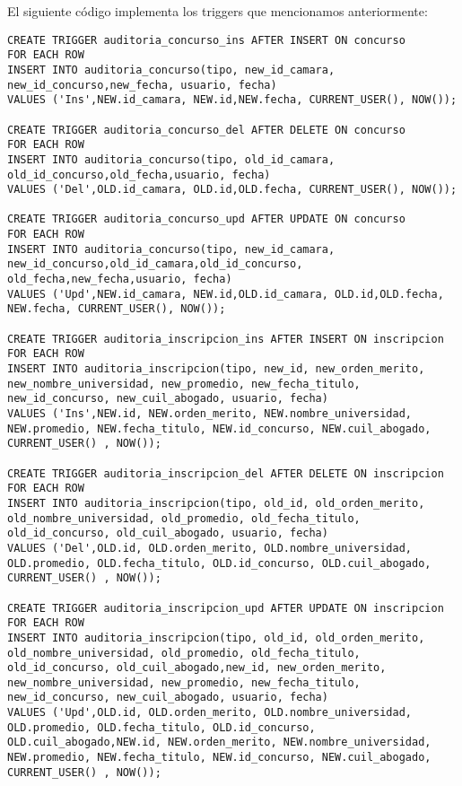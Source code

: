 El siguiente código implementa los triggers que mencionamos anteriormente:

\begin{verbatim}
CREATE TRIGGER auditoria_concurso_ins AFTER INSERT ON concurso
FOR EACH ROW
INSERT INTO auditoria_concurso(tipo, new_id_camara, new_id_concurso,new_fecha, usuario, fecha)
VALUES ('Ins',NEW.id_camara, NEW.id,NEW.fecha, CURRENT_USER(), NOW());

CREATE TRIGGER auditoria_concurso_del AFTER DELETE ON concurso
FOR EACH ROW
INSERT INTO auditoria_concurso(tipo, old_id_camara, old_id_concurso,old_fecha,usuario, fecha)
VALUES ('Del',OLD.id_camara, OLD.id,OLD.fecha, CURRENT_USER(), NOW());

CREATE TRIGGER auditoria_concurso_upd AFTER UPDATE ON concurso
FOR EACH ROW
INSERT INTO auditoria_concurso(tipo, new_id_camara, new_id_concurso,old_id_camara,old_id_concurso, old_fecha,new_fecha,usuario, fecha)
VALUES ('Upd',NEW.id_camara, NEW.id,OLD.id_camara, OLD.id,OLD.fecha, NEW.fecha, CURRENT_USER(), NOW());

CREATE TRIGGER auditoria_inscripcion_ins AFTER INSERT ON inscripcion
FOR EACH ROW
INSERT INTO auditoria_inscripcion(tipo, new_id, new_orden_merito, new_nombre_universidad, new_promedio, new_fecha_titulo, new_id_concurso, new_cuil_abogado, usuario, fecha)
VALUES ('Ins',NEW.id, NEW.orden_merito, NEW.nombre_universidad, NEW.promedio, NEW.fecha_titulo, NEW.id_concurso, NEW.cuil_abogado, CURRENT_USER() , NOW());

CREATE TRIGGER auditoria_inscripcion_del AFTER DELETE ON inscripcion
FOR EACH ROW
INSERT INTO auditoria_inscripcion(tipo, old_id, old_orden_merito, old_nombre_universidad, old_promedio, old_fecha_titulo, old_id_concurso, old_cuil_abogado, usuario, fecha)
VALUES ('Del',OLD.id, OLD.orden_merito, OLD.nombre_universidad, OLD.promedio, OLD.fecha_titulo, OLD.id_concurso, OLD.cuil_abogado, CURRENT_USER() , NOW());

CREATE TRIGGER auditoria_inscripcion_upd AFTER UPDATE ON inscripcion
FOR EACH ROW
INSERT INTO auditoria_inscripcion(tipo, old_id, old_orden_merito, old_nombre_universidad, old_promedio, old_fecha_titulo, old_id_concurso, old_cuil_abogado,new_id, new_orden_merito, new_nombre_universidad, new_promedio, new_fecha_titulo, new_id_concurso, new_cuil_abogado, usuario, fecha)
VALUES ('Upd',OLD.id, OLD.orden_merito, OLD.nombre_universidad, OLD.promedio, OLD.fecha_titulo, OLD.id_concurso, OLD.cuil_abogado,NEW.id, NEW.orden_merito, NEW.nombre_universidad, NEW.promedio, NEW.fecha_titulo, NEW.id_concurso, NEW.cuil_abogado, CURRENT_USER() , NOW());

\end{verbatim}

